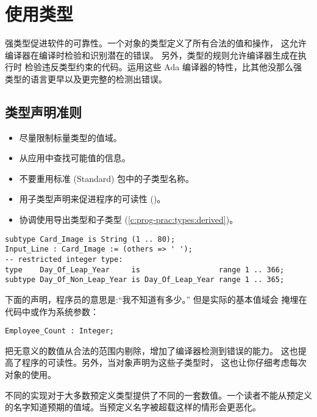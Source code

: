 %
%
%

\section{使用类型}

强类型促进软件的可靠性。一个对象的类型定义了所有合法的值和操作，
这允许编译器在编译时检验和识别潜在的错误。
另外，类型的规则允许编译器生成在执行时
检验违反类型约束的代码。运用这些 Ada 编译器的特性，比其他没那么强
类型的语言更早以及更完整的检测出错误。

\subsection{类型声明准则}
\begin{itemize}
    \item 尽量限制标量类型的值域。
    \item 从应用中查找可能值的信息。
    \item 不要重用标准 (Standard) 包中的子类型名称。
    \item 用子类型声明来促进程序的可读性 (\cite{booch87})。
    \item 协调使用导出类型和子类型 (\ref{c:prog-prac:types:derived})。
\end{itemize}

\begin{blockindent}
\begin{lstlisting}
subtype Card_Image is String (1 .. 80);
Input_Line : Card_Image := (others => ' ');
-- restricted integer type:
type    Day_Of_Leap_Year     is                  range 1 .. 366;
subtype Day_Of_Non_Leap_Year is Day_Of_Leap_Year range 1 .. 365;
\end{lstlisting}

下面的声明，程序员的意思是:``我不知道有多少。'' 但是实际的基本值域会
掩埋在代码中或作为系统参数：

\begin{lstlisting}
Employee_Count : Integer;
\end{lstlisting}
\end{blockindent}

\begin{blockindent}
把无意义的数值从合法的范围内剔除，增加了编译器检测到错误的能力。
这也提高了程序的可读性。另外，当对象声明为这些子类型时，
这也让你仔细考虑每次对象的使用。

不同的实现对于大多数预定义类型提供了不同的一套数值。一个读者不能从预定义
的名字知道预期的值域。当预定义名字被超载这样的情形会更恶化。
\end{blockindent}
